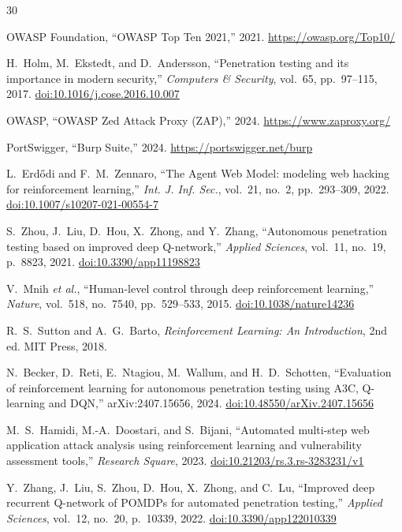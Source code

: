 \documentclass[5p,twocolumn]{elsarticle}
\begin{document}
\begin{thebibliography}{30}

 OWASP Foundation, ``OWASP Top Ten 2021,'' 2021. \url{https://owasp.org/Top10/}

 H.~Holm, M.~Ekstedt, and D.~Andersson, ``Penetration testing and its importance in modern security,'' \emph{Computers \& Security}, vol.~65, pp.~97--115, 2017. \href{https://doi.org/10.1016/j.cose.2016.10.007}{doi:10.1016/j.cose.2016.10.007}

 OWASP, ``OWASP Zed Attack Proxy (ZAP),'' 2024. \url{https://www.zaproxy.org/}

 PortSwigger, ``Burp Suite,'' 2024. \url{https://portswigger.net/burp}

 L.~Erd{\H o}di and F.~M.~Zennaro, ``The Agent Web Model: modeling web hacking for reinforcement learning,'' \emph{Int. J. Inf. Sec.}, vol.~21, no.~2, pp.~293--309, 2022. \href{https://doi.org/10.1007/s10207-021-00554-7}{doi:10.1007/s10207-021-00554-7}

 S.~Zhou, J.~Liu, D.~Hou, X.~Zhong, and Y.~Zhang, ``Autonomous penetration testing based on improved deep Q-network,'' \emph{Applied Sciences}, vol.~11, no.~19, p.~8823, 2021. \href{https://doi.org/10.3390/app11198823}{doi:10.3390/app11198823}

 V.~Mnih \emph{et al.}, ``Human-level control through deep reinforcement learning,'' \emph{Nature}, vol.~518, no.~7540, pp.~529--533, 2015. \href{https://doi.org/10.1038/nature14236}{doi:10.1038/nature14236}

 R.~S.~Sutton and A.~G.~Barto, \emph{Reinforcement Learning: An Introduction}, 2nd ed. MIT Press, 2018.

 N.~Becker, D.~Reti, E.~Ntagiou, M.~Wallum, and H.~D.~Schotten, ``Evaluation of reinforcement learning for autonomous penetration testing using A3C, Q-learning and DQN,'' arXiv:2407.15656, 2024. \href{https://doi.org/10.48550/arXiv.2407.15656}{doi:10.48550/arXiv.2407.15656}

 M.~S.~Hamidi, M.-A.~Doostari, and S.~Bijani, ``Automated multi-step web application attack analysis using reinforcement learning and vulnerability assessment tools,'' \emph{Research Square}, 2023. \href{https://doi.org/10.21203/rs.3.rs-3283231/v1}{doi:10.21203/rs.3.rs-3283231/v1}

 Y.~Zhang, J.~Liu, S.~Zhou, D.~Hou, X.~Zhong, and C.~Lu, ``Improved deep recurrent Q-network of POMDPs for automated penetration testing,'' \emph{Applied Sciences}, vol.~12, no.~20, p.~10339, 2022. \href{https://doi.org/10.3390/app122010339}{doi:10.3390/app122010339}


\end{thebibliography}
\end{document}
